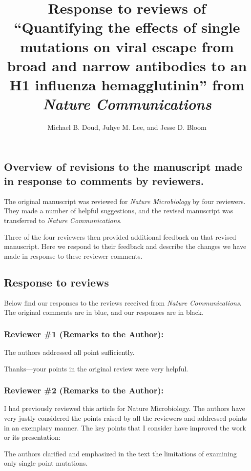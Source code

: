 \documentclass[11pt, oneside]{article}   	%
\title{Response to reviews of ``Quantifying the effects of single mutations on viral escape from broad and narrow antibodies to an H1 influenza hemagglutinin'' from \textit{Nature Communications}}
\author{Michael B. Doud, Juhye M. Lee, and Jesse D. Bloom}
\begin{document}
\maketitle

\subsection*{Overview of revisions to the manuscript made in response to comments by reviewers.}

The original manuscript was reviewed for \textit{Nature Microbiology} by four reviewers.
They made a number of helpful suggestions, and the revised manuscript was transferred to \textit{Nature Communications}.

Three of the four reviewers then provided additional feedback on that revised manuscript. 
Here we respond to their feedback and describe the changes we have made in response to these reviewer comments.

\subsection*{Response to reviews}
Below find our responses to the reviews received from \textit{Nature Communications}.
The original comments {\color{blue} are in blue}, and our responses are in black.

\color{blue}

\subsubsection*{Reviewer \#1 (Remarks to the Author):}

The authors addressed all point sufficiently.

{\color{black}
Thanks---your points in the original review were very helpful.}


\subsubsection*{Reviewer \#2 (Remarks to the Author):}

I had previously reviewed this article for Nature Microbiology. The authors have very justly considered the points raised by all the reviewers and addressed points in an exemplary manner. The key points that I consider have improved the work or its presentation:

The authors clarified and emphasized in the text the limitations of examining only single point mutations.
\end{document}
